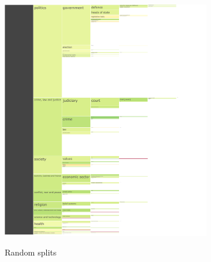 \begin{figure}[!htbp]
    \centering
	\begin{subfigure}{0.49\textwidth}
            \centering
    \href{https://martinomensio.github.io/phd-project/figures/baly_iptc_weighted_f1_random_bert.html}{\includegraphics[trim={2.65cm 0cm 0cm 0cm},clip,width=\linewidth]{figures/baly_iptc_weighted_f1_random_bert.pdf}}
    \caption{Random splits}
    \label{fig:baly_iptc_weighted_f1_random_bert}
\end{subfigure}
\begin{subfigure}{0.49\textwidth}
            \centering

\end{subfigure}
\end{figure}
